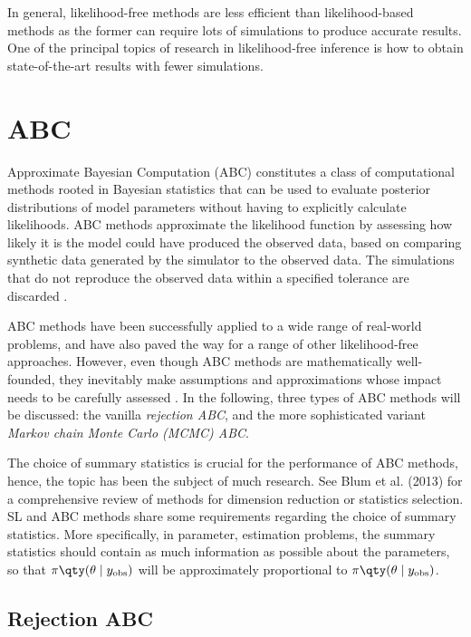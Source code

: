 In general, likelihood-free methods are less efficient than likelihood-based methods as the former can require lots of simulations to produce accurate results. One of the principal topics of research in likelihood-free inference is how to obtain state-of-the-art results with fewer simulations. 

\section{ABC}

Approximate Bayesian Computation (ABC) constitutes a class of computational methods rooted in Bayesian statistics that can be used to evaluate posterior distributions of model parameters without having to explicitly calculate likelihoods. ABC methods approximate the likelihood function by assessing how likely it is the model could have produced the observed data, based on comparing synthetic data generated by the simulator to the observed data. The simulations that do not reproduce the observed data within a specified tolerance are discarded \cite{ABCprimer}.

ABC methods have been successfully applied to a wide range of real-world problems, and have also paved the way for a range of other likelihood-free approaches. However, even though ABC methods are mathematically well-founded, they inevitably make assumptions and approximations whose impact needs to be carefully assessed \cite{ABCprimer}. In the following, three types of ABC methods will be discussed: the vanilla \textit{rejection ABC}, and the more sophisticated variant \textit{Markov chain Monte Carlo (MCMC) ABC}.

The choice of summary statistics is crucial for the performance of ABC methods, hence, the topic has been the subject of much research. See Blum et al. (2013) for a comprehensive review of methods for dimension reduction or statistics selection. SL and ABC methods share some requirements regarding the choice of summary statistics. More specifically, in parameter, estimation problems, the summary statistics should contain as much information as possible about the parameters, so that $\pi \qty(\theta \mid y_\mathrm{obs})$ will be approximately proportional to $\pi \qty(\theta \mid y_\mathrm{obs})$. \cite{ABC_ch20} 

\subsection{Rejection ABC}\label{sec:rejection_abc}

